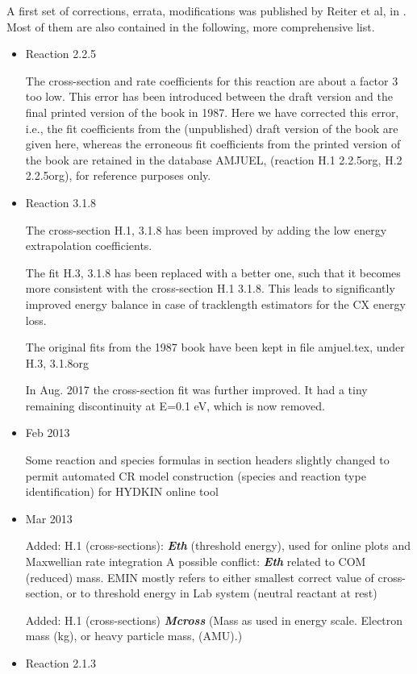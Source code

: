\documentclass[12pt,dvipdfmx]{article}
\begin{document}
A first set of corrections, errata, modifications was published by Reiter et al,
in \cite{kn:Reiter92}.
Most of them are also contained in the following, more comprehensive list.
\begin{itemize}
\item{Reaction 2.2.5}

The cross-section and rate coefficients for this reaction are about a
factor 3 too low. This error has been introduced between the draft version and
the final printed version of the book in 1987. Here we have corrected this error,
i.e., the fit coefficients from the (unpublished) draft version of the book are
given here, whereas the erroneous fit coefficients from the printed version
of the book are retained in the database AMJUEL, (reaction H.1 2.2.5org, H.2 2.2.5org), for reference
purposes only.
\item{Reaction 3.1.8}

The cross-section H.1, 3.1.8 has been improved by adding
the low energy extrapolation coefficients.

The fit H.3, 3.1.8 has been replaced with a better one, such that
it becomes more consistent with the cross-section H.1 3.1.8.
This leads to significantly improved energy balance in case of
tracklength estimators for the CX energy loss.

The original fits from the 1987 book have been kept in file amjuel.tex,
under H.3, 3.1.8org

In Aug. 2017 the cross-section fit was further improved. It had a tiny remaining discontinuity
at E=0.1 eV, which is now removed.
\item{Feb 2013}

Some reaction and species formulas in section headers slightly changed to permit automated CR
model construction (species and reaction type identification) for HYDKIN online tool
\item{Mar 2013}

Added: H.1 (cross-sections): \textbf{\emph{Eth}} (threshold energy), used for online plots and Maxwellian rate integration
A possible conflict: \textbf{\emph{Eth}} related to COM (reduced) mass. EMIN mostly refers to either
smallest correct value of cross-section, or to threshold energy in Lab system (neutral reactant at rest)

Added: H.1 (cross-sections) \textbf{\emph{Mcross}} (Mass as used in energy scale. Electron mass (kg), or heavy particle mass, (AMU).)

\item{Reaction 2.1.3}


\end{itemize}
\end{document}
